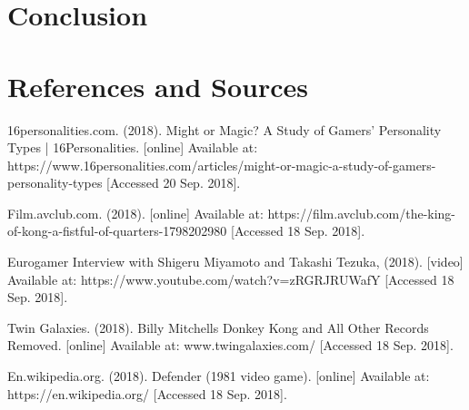 \documentclass{article}
\begin{document}
\section{Conclusion}

\section{References and Sources}

16personalities.com. (2018). Might or Magic? A Study of Gamers’ Personality Types | 16Personalities. [online] Available at: https://www.16personalities.com/articles/might-or-magic-a-study-of-gamers-personality-types [Accessed 20 Sep. 2018]. \newline

Film.avclub.com. (2018). [online] Available at: https://film.avclub.com/the-king-of-kong-a-fistful-of-quarters-1798202980 [Accessed 18 Sep. 2018]. \newline


Eurogamer Interview with Shigeru Miyamoto and Takashi Tezuka, (2018). [video] Available at: https://www.youtube.com/watch?v=zRGRJRUWafY [Accessed 18 Sep. 2018].

Twin Galaxies. (2018). Billy Mitchells Donkey Kong and All Other Records Removed. [online] Available at: www.twingalaxies.com/ [Accessed 18 Sep. 2018]. \newline

En.wikipedia.org. (2018). Defender (1981 video game). [online] Available at: https://en.wikipedia.org/ [Accessed 18 Sep. 2018]. \newline
\end{document}
